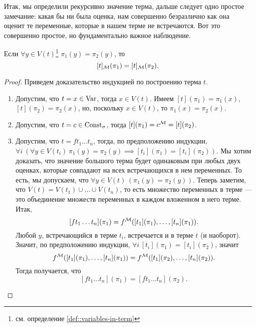 Итак, мы определили рекурсивно значение терма, дальше следует одно простое замечание: какая бы ни была оценка, нам совершенно безразлично как она оценит те переменные, которые в нашем терме не встречаются.
Вот это совершенно простое, но фундаментально важное наблюдение.

\begin{lemma} \label{lem::evaluation-of-variables-in-term}
    Если $\forall y \in V(t)$\footnote{см. определение \ref{def::variables-in-term}} $\pi_{1}(y) = \pi_{2}(y)$, то
    $$
        [t]_{\mathcal{M}}(\pi_{1}) = [t]_{\mathcal{M}}(\pi_{2}).
    $$
\end{lemma}

\begin{proof}
    Приведем доказательство индукцией по построению терма $t$.
    \begin{enumerate}
        \item Допустим, что $t = x \in \mathrm{Var}$, тогда $x \in V(t)$.
        Имеем $[t](\pi_1) = \pi_{1}(x)$, $[t](\pi_{2}) = \pi_{2}(x)$, но, поскольку $x \in V(t)$, то $\pi_{1}(x) = \pi_{2}(x)$.
        \item Допустим, что $t = c \in \mathrm{Const}_{\sigma}$, тогда $[t](\pi_{1}) = c^{\mathcal{M}} = [t](\pi_{2})$.
        \item Допустим, что $t = f t_{1} \ldots t_{n}$, тогда, по предположению индукции, $\forall i~(\forall y \in V(t_{i})~\pi_{1}(y) = \pi_{2}(y) \implies [t_{i}](\pi_{1}) = [t_{i}](\pi_{2}))$.
        Мы хотим доказать, что значение большого терма будет одинаковым при любых двух оценках, которые совпадают на всех встречающихся в нем переменных.
        То есть, мы допускаем, что $\forall y \in V(t)~(\pi_{1}(y) = \pi_{2}(y))$.
        Теперь заметим, что $V(t) = V(t_{1}) \cup \ldots \cup V(t_{n})$, то есть множество переменных в терме --- это объединение множеств переменных в каждом вложенном в него терме.
        Итак,
        $$
            [f t_{1} \ldots t_{n}](\pi_{1}) = f^{\mathcal{M}}([t_{1}](\pi_{1}), \ldots, [t_{n}](\pi_{1})).
        $$
        Любой $y$, встречающийся в терме $t_{i}$, встречается и в терме $t$ (и наоборот).
        Значит, по предположению индукции, $\forall i~ [t_{i}](\pi_{1}) = [t_{i}](\pi_{2})$, значит
        $$
            f^{\mathcal{M}}([t_{1}](\pi_{1}), \ldots, [t_{n}](\pi_{1})) = f^{\mathcal{M}}([t_{1}](\pi_{2}), \ldots, [t_{n}](\pi_{2})).
        $$
        Тогда получается, что
        $$
            [f t_{1} \ldots t_{n}](\pi_{1}) = [f t_{1} \ldots t_{n}](\pi_{2}).
        $$
    \end{enumerate}
\end{proof}

